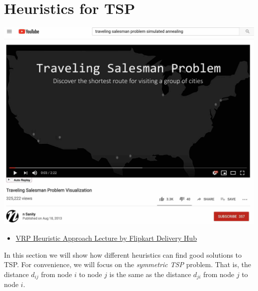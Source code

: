 
\chapter{Heuristics for TSP}
\begin{resource}

\begin{center}
\href{https://www.youtube.com/watch?v=SC5CX8drAtU}{\includegraphics[scale = 0.13]{optimization/figures/figures-static/youtube-tsp-simulated-annealing}}
\end{center}

\begin{itemize}
\item \href{https://www.youtube.com/watch?v=v9tUEsHD6BE&ab_channel=HasgeekTV}{VRP Heuristic Approach Lecture by Flipkart Delivery Hub}
\end{itemize}
\end{resource}
In this section we will show how different heuristics can find good solutions to TSP.  For convenience,  we will focus on the \emph{symmetric TSP} problem.  That is, the distance $d_{ij}$ from node $i$ to node $j$ is the same as the distance $d_{ji}$ from node $j$ to node $i$.

